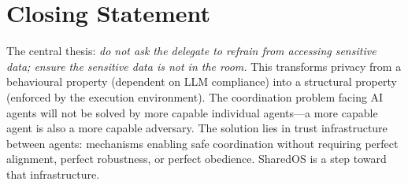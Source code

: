 \section{Closing Statement}
\label{sec:closing}

The central thesis: \textit{do not ask the delegate to refrain from accessing sensitive data; ensure the sensitive data is not in the room.} This transforms privacy from a behavioural property (dependent on LLM compliance) into a structural property (enforced by the execution environment). The coordination problem facing AI agents will not be solved by more capable individual agents---a more capable agent is also a more capable adversary. The solution lies in trust infrastructure between agents: mechanisms enabling safe coordination without requiring perfect alignment, perfect robustness, or perfect obedience. SharedOS is a step toward that infrastructure.
